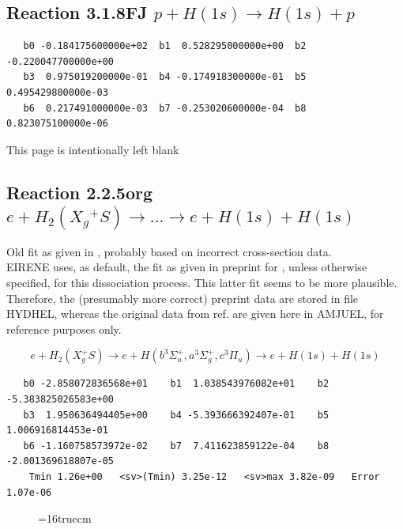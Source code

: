 \documentclass[12pt,dvipdfmx]{article}
\begin{document}
\subsection{
Reaction 3.1.8FJ  $p + H(1s) \rightarrow H(1s) + p  $
}


\begin{small}\begin{verbatim}
   b0 -0.184175600000e+02  b1  0.528295000000e+00  b2 -0.220047700000e+00
   b3  0.975019200000e-01  b4 -0.174918300000e-01  b5  0.495429800000e-03
   b6  0.217491000000e-03  b7 -0.253020600000e-04  b8  0.823075100000e-06
\end{verbatim}\end{small}

\newpage
This page is intentionally left blank
\newpage


\subsection{
Reaction 2.2.5org
$e + H_2(X_g\!^+ S ) \rightarrow . . .\rightarrow e + H(1s) + H(1s)$}


Old fit as given in \cite{kn:Janev}, probably based on incorrect cross-section data.\\
      EIRENE uses, as default, the fit as given in preprint for \cite{kn:Janev},
      unless otherwise specified, for this dissociation process.
      This latter fit seems to be more plausible. Therefore, the
      (presumably more correct) preprint data are stored in file HYDHEL,
      whereas the original data from ref.\cite{kn:Janev} are given here in AMJUEL,
      for reference purposes only.



\begin{displaymath}
 e + H_2(X_g^+ S) \rightarrow e + H(b^3\Sigma^+_u , a^3\Sigma^+_g,
c^3\Pi_u)
             \rightarrow e + H(1s) + H(1s)
\end{displaymath}



\begin{small}\begin{verbatim}
   b0 -2.858072836568e+01    b1  1.038543976082e+01    b2 -5.383825026583e+00
   b3  1.950636494405e+00    b4 -5.393666392407e-01    b5  1.006916814453e-01
   b6 -1.160758573972e-02    b7  7.411623859122e-04    b8 -2.001369618807e-05
    Tmin 1.26e+00   <sv>(Tmin) 3.25e-12   <sv>max 3.82e-09   Error 1.07e-06
\end{verbatim}\end{small}
\begin{figure} \label{2.2.5.org}
\epsfxsize=16truecm
\end{figure}
\end{document}
